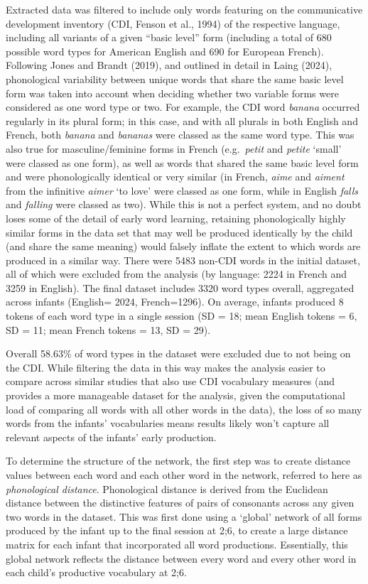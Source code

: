 \documentclass[
  man]{apa6}
\begin{document}
Extracted data was filtered to include only words featuring on the communicative development inventory (CDI, Fenson et al., 1994) of the respective language, including all variants of a given ``basic level'' form (including a total of 680 possible word types for American English and 690 for European French). Following Jones and Brandt (2019), and outlined in detail in Laing (2024), phonological variability between unique words that share the same basic level form was taken into account when deciding whether two variable forms were considered as one word type or two. For example, the CDI word \emph{banana} occurred regularly in its plural form; in this case, and with all plurals in both English and French, both \emph{banana} and \emph{bananas} were classed as the same word type. This was also true for masculine/feminine forms in French (e.g.~\emph{petit} and \emph{petite} `small' were classed as one form), as well as words that shared the same basic level form and were phonologically identical or very similar (in French, \emph{aime} and \emph{aiment} from the infinitive \emph{aimer} `to love' were classed as one form, while in English \emph{falls} and \emph{falling} were classed as two). While this is not a perfect system, and no doubt loses some of the detail of early word learning, retaining phonologically highly similar forms in the data set that may well be produced identically by the child (and share the same meaning) would falsely inflate the extent to which words are produced in a similar way. There were 5483 non-CDI words in the initial dataset, all of which were excluded from the analysis (by language: 2224 in French and 3259 in English). The final dataset includes 3320 word types overall, aggregated across infants (English=
2024, French=1296). On average, infants produced 8 tokens of each word type in a single session (SD = 18; mean English tokens = 6, SD = 11; mean French tokens = 13, SD = 29).

Overall 58.63\% of word types in the dataset were excluded due to not being on the CDI. While filtering the data in this way makes the analysis easier to compare across similar studies that also use CDI vocabulary measures (and provides a more manageable dataset for the analysis, given the computational load of comparing all words with all other words in the data), the loss of so many words from the infants' vocabularies means results likely won't capture all relevant aspects of the infants' early production.

To determine the structure of the network, the first step was to create distance values between each word and each other word in the network, referred to here as \emph{phonological distance}. Phonological distance is derived from the Euclidean distance between the distinctive features of pairs of consonants across any given two words in the dataset. This was first done using a `global' network of all forms produced by the infant up to the final session at 2;6, to create a large distance matrix for each infant that incorporated all word productions. Essentially, this global network reflects the distance between every word and every other word in each child's productive vocabulary at 2;6.
\end{document}
